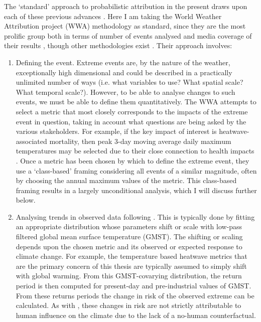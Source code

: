     The `standard' approach to probabilistic attribution in the present draws upon each of these previous advances \citep{philip_protocol_2020}. Here I am taking the World Weather Attribution project (WWA) methodology as standard, since they are the most prolific group both in terms of number of events analysed and media coverage of their results \citep{van_oldenborgh_pathways_2021}, though other methodologies exist \citep{lewis_anthropogenic_2013}. Their approach involves:
    \begin{enumerate}
      \item Defining the event. Extreme events are, by the nature of the weather, exceptionally high dimensional and could be described in a practically unlimited number of ways (i.e. what variables to use? What spatial scale? What temporal scale?). However, to be able to analyse changes to such events, we must be able to define them quantitatively. The WWA attempts to select a metric that most closely corresponds to the impacts of the extreme event in question, taking in account what questions are being asked by the various stakeholders. For example, if the key impact of interest is heatwave-associated mortality, then peak 3-day moving average daily maximum temperatures may be selected due to their close connection to health impacts \citep{dippoliti_impact_2010}. Once a metric has been chosen by which to define the extreme event, they use a `class-based' framing considering all events of a similar magnitude, often by choosing the annual maximum values of the metric. This class-based framing results in a largely unconditional analysis, which I will discuss further below.
      \item Analysing trends in observed data following \citet{van_oldenborgh_how_2007}. This is typically done by fitting an appropriate distribution whose parameters shift or scale with low-pass filtered global mean surface temperature (GMST). The shifting or scaling depends upon the chosen metric and its observed or expected response to climate change. For example, the temperature based heatwave metrics that are the primary concern of this thesis are typically assumed to simply shift with global warming. From this GMST-covarying distribution, the return period is then computed for present-day and pre-industrial values of GMST. From these returns periods the change in risk of the observed extreme can be calculated. As with \citet{van_oldenborgh_how_2007}, these changes in risk are not strictly attributable to human influence on the climate due to the lack of a no-human counterfactual.

\end{enumerate}
